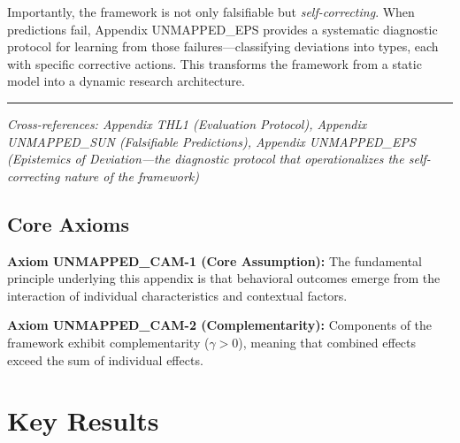 Importantly, the framework is not only falsifiable but \textit{self-correcting}. When predictions fail, Appendix UNMAPPED_EPS provides a systematic diagnostic protocol for learning from those failures---classifying deviations into types, each with specific corrective actions. This transforms the framework from a static model into a dynamic research architecture.

\vspace{1em}
\hrule
\vspace{0.5em}
\noindent\textit{Cross-references: Appendix THL1 (Evaluation Protocol), 
Appendix UNMAPPED_SUN (Falsifiable Predictions), Appendix UNMAPPED_EPS (Epistemics of Deviation---the 
diagnostic protocol that operationalizes the self-correcting nature of the framework)}






\subsection{Core Axioms}
\label{sec:cam-axioms}

\begin{tcolorbox}[colback=yellow!5!white,colframe=yellow!75!black,title=Axiom UNMAPPED_CAM-1: Fundamental Principle]
\textbf{Axiom UNMAPPED_CAM-1 (Core Assumption):}
The fundamental principle underlying this appendix is that behavioral outcomes
emerge from the interaction of individual characteristics and contextual factors.
\end{tcolorbox}

\begin{tcolorbox}[colback=yellow!5!white,colframe=yellow!75!black,title=Axiom UNMAPPED_CAM-2: Complementarity]
\textbf{Axiom UNMAPPED_CAM-2 (Complementarity):}
Components of the framework exhibit complementarity ($\gamma > 0$), meaning
that combined effects exceed the sum of individual effects.
\end{tcolorbox}


\section{Key Results}
\label{sec:cam-results}

